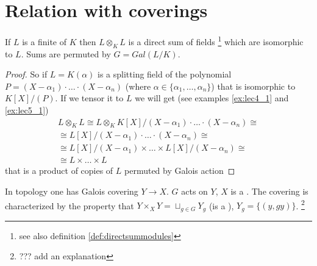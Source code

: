 \section{Relation with coverings}

\begin{remark}
  If $L$ is a finite  of $K$ then
  $ L \otimes_K L$ is a direct sum of fields
  \footnote{
    see also definition \ref{def:directsummodules}
  }
  which are
  isomorphic to $L$. Sums are permuted by $G = Gal\left(L/K\right)$.
  \begin{proof}
  So if $L = K\left(\alpha\right)$ is a splitting field of the
  polynomial $P = \left(X - \alpha_1\right) \cdot \dots \cdot \left(X
  - \alpha_n\right)$ (where $\alpha \in \{\alpha_1, \dots,
  \alpha_n\}$) that is isomorphic to $K\left[X\right]/(P)$. If 
  we tensor it to $L$ we will get (see examples \ref{ex:lec4_1} and
  \ref{ex:lec5_1}) 
  \begin{eqnarray}
    L \otimes_K L \cong
    L \otimes_K K\left[X\right]/\left(X - \alpha_1\right) \cdot \dots \cdot \left(X
    - \alpha_n\right) \cong
    \nonumber \\
    \cong
  L\left[X\right]/\left(X - \alpha_1\right) \cdot \dots \cdot \left(X
  - \alpha_n\right) \cong
  \nonumber \\
  \cong
  L\left[X\right]/\left(X - \alpha_1\right) \times
  \dots \times
  L\left[X\right]/\left(X - \alpha_n\right) \cong
  \nonumber  \\
  \cong
  L \times \dots \times L
  \nonumber
  \end{eqnarray}
  that is a product of copies of $L$ permuted by Galois action
  \end{proof}
  \label{rem:lec8_1}
\end{remark}

In topology one has Galois covering $Y \to X$. $G$ acts on $Y$, $X$ is
a . The covering is characterized
by the property that $Y 
\times_X Y = \sqcup_{g \in G} Y_g$ (is a ),
$Y_g = \{\left(y, gy\right)\}$. 
\footnote{
  ??? add an explanation
}
